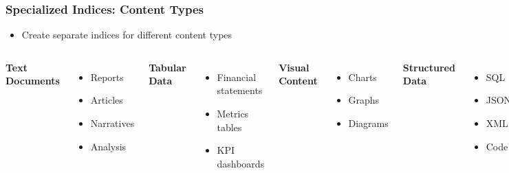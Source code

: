\begin{frame}
    \frametitle{Specialized Indices: Content Types}
    \begin{itemize}
        \item Create separate indices for different content types
    \end{itemize}
    
    \begin{columns}
        \textbf{Text Documents}
        \begin{itemize}
            \item Reports
            \item Articles
            \item Narratives
            \item Analysis
        \end{itemize}
        
        \textbf{Tabular Data}
        \begin{itemize}
            \item Financial statements
            \item Metrics tables
            \item KPI dashboards
        \end{itemize}
        
        \textbf{Visual Content}
        \begin{itemize}
            \item Charts
            \item Graphs
            \item Diagrams
        \end{itemize}
        
        \textbf{Structured Data}
        \begin{itemize}
            \item SQL
            \item JSON
            \item XML
            \item Code
        \end{itemize}
    \end{columns}
\end{frame}

